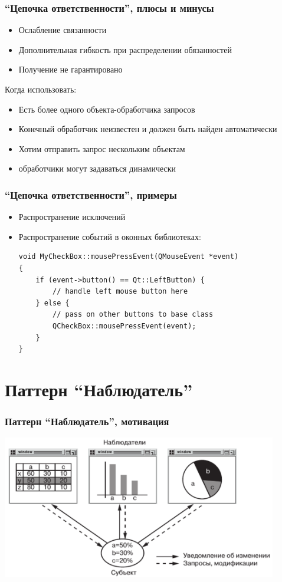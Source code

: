 \documentclass[xetex,mathserif,serif]{beamer}
\begin{document}
	\begin{frame}
		\frametitle{``Цепочка ответственности'', плюсы и минусы}
		\begin{itemize}
			\item Ослабление связанности
			\item Дополнительная гибкость при распределении обязанностей
			\item Получение не гарантировано
		\end{itemize}
		Когда использовать:
		\begin{itemize}
			\item Есть более одного объекта-обработчика запросов
			\item Конечный обработчик неизвестен и должен быть найден автоматически
			\item Хотим отправить запрос нескольким объектам
			\item обработчики могут задаваться динамически
		\end{itemize}
	\end{frame}

	\begin{frame}[fragile]
		\frametitle{``Цепочка ответственности'', примеры}
		\begin{itemize}
			\item Распространение исключений
			\item Распространение событий в оконных библиотеках:
			\begin{verbatim}
void MyCheckBox::mousePressEvent(QMouseEvent *event)
{
    if (event->button() == Qt::LeftButton) {
        // handle left mouse button here
    } else {
        // pass on other buttons to base class
        QCheckBox::mousePressEvent(event);
    }
}
			\end{verbatim}
		\end{itemize}
	\end{frame}

	\section{Паттерн ``Наблюдатель''}

	\begin{frame}
		\frametitle{Паттерн ``Наблюдатель'', мотивация}
		\begin{center}
			\includegraphics[width=0.9\textwidth]{observerExample.png}
		\end{center}
	\end{frame}
\end{document}
